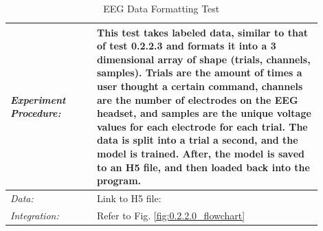 \documentclass[conference]{IEEEtran}
\begin{document}
\begin{table}[!ht]
\begin{tabular}{|>{\columncolor{black!5}}p{0.25\linewidth}|>{}p{0.65\linewidth}|}
            \\ \hline

            \textit{Experiment Procedure:} & This test takes labeled data, similar to that of test 0.2.2.3 and formats it into a 3 dimensional array of shape (trials, channels, samples). Trials are the amount of times a user thought a certain command, channels are the number of electrodes on the EEG headset, and samples are the unique voltage values for each electrode for each trial. The data is split into a trial a second, and the model is trained. After, the model is saved to an H5 file, and then loaded back into the program.  

            \\ \hline 



            \textit{Data:} & Link to H5 file: {\url{https://github.com/kguilly/BrainControlledWheelchair/blob/main/EEG_ML/tests/test_data/0.2.2.4_model.h5} 

            \\ \hline 

            \textit{Integration:} & Refer to Fig. \ref{fig:0.2.2.0_flowchart}



            \\ \hline


           
             
        \end{tabular}           
        \caption{EEG Data Formatting Test}
        \label{tab:0.2.2.4_testtable}
    \end{table}
\end{document}
